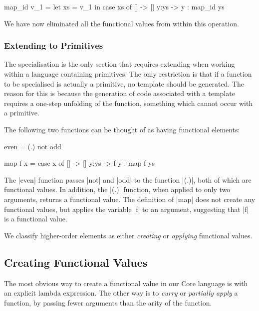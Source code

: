 \documentclass[preprint]{sigplanconf}
\begin{document}
\begin{code}
map_id v_1 =  let  xs = v_1
              in   case  xs of
                         []    -> []
                         y:ys  -> y : map_id ys
\end{code}

We have now eliminated all the functional values from within this operation.


\subsubsection{Extending to Primitives}

The specialisation is the only section that requires extending when working within a language containing primitives. The only restriction is that if a function to be specialised is actually a primitive, no template should be generated. The reason for this is because the generation of code associated with a template requires a one-step unfolding of the function, something which cannot occur with a primitive.


\begin{example}
\label{ex:ho_elements}
The following two functions can be thought of as having functional elements:

\begin{code}
even = (.) not odd

map f x = case  x of
                []    -> []
                y:ys  -> f y : map f ys
\end{code}

The |even| function passes |not| and |odd| to the function |(.)|, both of which are functional values. In addition, the |(.)| function, when applied to only two arguments, returns a functional value. The definition of |map| does not create any functional values, but applies the variable |f| to an argument, suggesting that |f| is a functional value.
\end{example}

We classify higher-order elements as either \textit{creating} or \textit{applying} functional values.

\subsection{Creating Functional Values}

The most obvious way to create a functional value in our Core language is with an explicit lambda expression. The other way is to \textit{curry} or \textit{partially apply} a function, by passing fewer arguments than the arity of the function.
\end{document}
